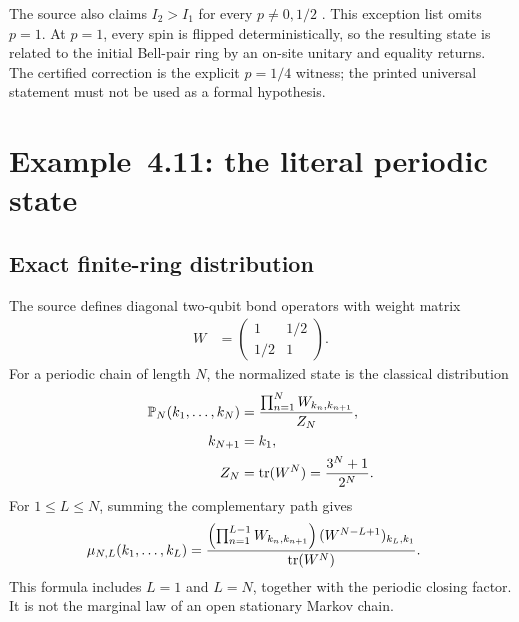 \documentclass{article}
\begin{document}
The source also claims $I_2>I_1$ for every $p\ne 0,1/2$
\cite[Example~4.10]{Cirac2016MPDO_arXiv}. This exception list omits $p=1$.
At $p=1$, every spin is flipped deterministically, so the resulting state is
related to the initial Bell-pair ring by an on-site unitary and equality
returns. The certified correction is the explicit $p=1/4$ witness; the printed
universal statement must not be used as a formal hypothesis.

\section{Example~4.11: the literal periodic state}

\subsection{Exact finite-ring distribution}

The source defines diagonal two-qubit bond operators with weight matrix
\begin{align}
    W
        &= \begin{pmatrix}
            1 & 1/2\\
            1/2 & 1
        \end{pmatrix}.
    \label{eq:cpsv16_examples_4_10_4_11_entropy_example411_weight_matrix}
\end{align}
For a periodic chain of length $N$, the normalized state is the classical
distribution
\begin{align}
    \mathbb P_N(k_1,\ldots,k_N)
        &= \frac{\prod_{n=1}^{N}W_{k_n,k_{n+1}}}{Z_N},
    \label{eq:cpsv16_examples_4_10_4_11_entropy_example411_distribution}\\
    k_{N+1}
        &= k_1,
    \label{eq:cpsv16_examples_4_10_4_11_entropy_example411_periodic_boundary}\\
    Z_N
        &= \operatorname{tr}(W^N)
         = \frac{3^N+1}{2^N}.
    \label{eq:cpsv16_examples_4_10_4_11_entropy_example411_partition_function}
\end{align}
For $1\leq L\leq N$, summing the complementary path gives
\begin{align}
    \mu_{N,L}(k_1,\ldots,k_L)
        &= \frac{
            \left(\prod_{n=1}^{L-1}W_{k_n,k_{n+1}}\right)
            (W^{N-L+1})_{k_L,k_1}}
            {\operatorname{tr}(W^N)}.
    \label{eq:cpsv16_examples_4_10_4_11_entropy_example411_reduced_probability}
\end{align}
This formula includes $L=1$ and $L=N$, together with the periodic closing
factor. It is not the marginal law of an open stationary Markov chain.
\end{document}
